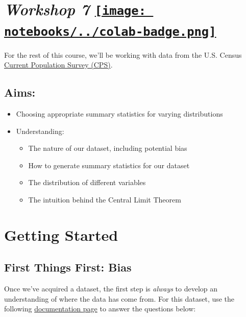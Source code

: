\documentclass[
  letterpaper,
  DIV=11,
  numbers=noendperiod]{scrreprt}
\providecommand{\tightlist}{%
  \setlength{\itemsep}{0pt}\setlength{\parskip}{0pt}}\usepackage{longtable,booktabs,array}
\begin{document}
\hypertarget{workshop-7-open-in-colab}{%
\section[\emph{Workshop 7} ]{\texorpdfstring{\emph{Workshop 7}
\href{https://colab.research.google.com/github/oballinger/QM2/blob/main/notebooks/W07.\%20Distributions\%20and\%20Basic\%20Statistics.ipynb}{\protect\texttt{[image: notebooks/../colab-badge.png]}}}{Workshop 7 Open In Colab}}\label{workshop-7-open-in-colab}}

For the rest of this course, we'll be working with data from the U.S.
Census \href{https://www.census.gov/programs-surveys/cps.html}{Current
Population Survey (CPS)}.

\hypertarget{aims-3}{%
\subsection{Aims:}\label{aims-3}}

\begin{itemize}
\item
  Choosing appropriate summary statistics for varying distributions
\item
  Understanding:

  \begin{itemize}
  \tightlist
  \item
    The nature of our dataset, including potential bias
  \item
    How to generate summary statistics for our dataset
  \item
    The distribution of different variables
  \item
    The intuition behind the Central Limit Theorem
  \end{itemize}
\end{itemize}

\hypertarget{getting-started}{%
\section{Getting Started}\label{getting-started}}

\hypertarget{first-things-first-bias}{%
\subsection{First Things First: Bias}\label{first-things-first-bias}}

Once we've acquired a dataset, the first step is \emph{always} to
develop an understanding of where the data has come from. For this
dataset, use the following
\href{https://www.census.gov/programs-surveys/cps/technical-documentation/methodology.html}{documentation
page} to answer the questions below:
\end{document}
